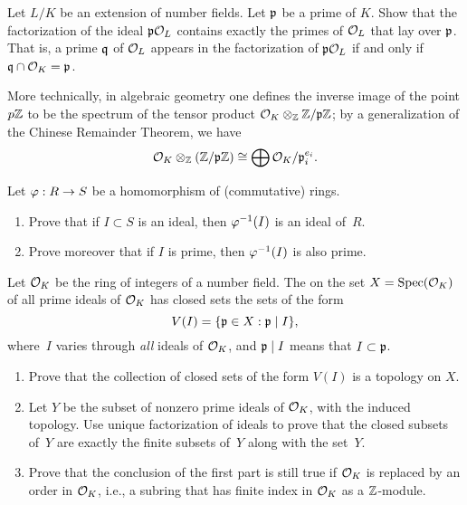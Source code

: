 \begin{exercise}
	Let $L/K$ be an extension of number fields. Let $\mathfrak{p}$ be a prime of $K$.
	Show that the factorization of the ideal $\mathfrak{p}\mathcal{O}_L$ contains exactly the primes
	of $\mathcal{O}_L$ that lay over $\mathfrak{p}$. That is, a prime $\mathfrak{q}$ of $\mathcal{O}_L$ appears in
	the factorization of $\mathfrak{p}\mathcal{O}_L$ if and only if $\mathfrak{q} \cap \mathcal{O}_K = \mathfrak{p}$.
\end{exercise}

\begin{remark}
  More technically, in algebraic geometry one defines the inverse
  image of the point $p\mathbb{Z}$ to be the spectrum of the tensor product
  $\mathcal{O}_K \otimes_{\mathbb{Z}} \mathbb{Z}/\mathfrak{p}\mathbb{Z}$; by a generalization of the Chinese
  Remainder Theorem, we have
$$
  \mathcal{O}_K \otimes_{\mathbb{Z}} \left(\mathbb{Z}/\mathfrak{p}\mathbb{Z}\right) \cong \bigoplus \mathcal{O}_K/\mathfrak{p}_i^{e_i}.
$$
\end{remark}

\begin{exercise}
	Let $\varphi:R\to S$ be a homomorphism of (commutative) rings.
	\begin{enumerate}
		\item Prove that if $I\subset S$ is an ideal, then $\varphi^{-1}(I)$
		is an ideal of~$R$.
		\item Prove moreover that if $I$ is prime, then $\varphi^{-1}(I)$ is
		also prime.
	\end{enumerate}
\end{exercise}

\begin{exercise}
	Let $\mathcal{O}_K$ be the ring of integers of a number field.
	The  on the set $X=\operatorname{Spec}(\mathcal{O}_K)$ of all prime ideals
	of $\mathcal{O}_K$ has closed sets the sets of the form
	$$
		V(I) = \{ \mathfrak{p}\in X : \mathfrak{p} \mid I\},
	$$
	where~$I$ varies through {\em all} ideals of $\mathcal{O}_K$, and $\mathfrak{p}\mid I$ means
	that $I \subset \mathfrak{p}$.
	\begin{enumerate}
		\item\label{exercise:zariski-part-1} Prove that the collection of closed
		sets of the form $V(I)$ is a topology on $X$.
		\item Let $Y$ be the subset of nonzero prime ideals of $\mathcal{O}_K$, with the
		induced topology. Use unique factorization of ideals to prove that the
		closed subsets of~$Y$ are exactly the finite subsets of~$Y$ along with
		the set~$Y$.
		\item Prove that the conclusion of the first part is still true
		if $\mathcal{O}_K$ is replaced by an order in $\mathcal{O}_K$, i.e., a subring that
		has finite index in $\mathcal{O}_K$ as a $\mathbb{Z}$-module.
	\end{enumerate}
\end{exercise}

